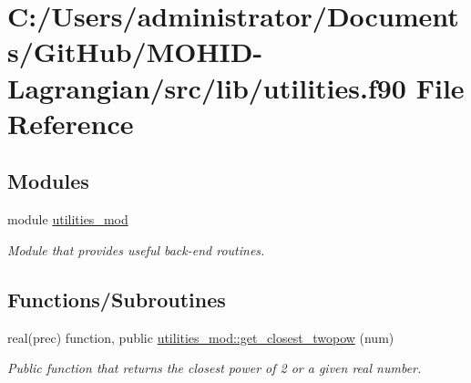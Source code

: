 \hypertarget{utilities_8f90}{}\section{C\+:/\+Users/administrator/\+Documents/\+Git\+Hub/\+M\+O\+H\+I\+D-\/\+Lagrangian/src/lib/utilities.f90 File Reference}
\label{utilities_8f90}
\subsection*{Modules}
\begin{DoxyCompactItemize}
\item 
module \mbox{\hyperlink{namespaceutilities__mod}{utilities\+\_\+mod}}
\begin{DoxyCompactList}\small\item\em Module that provides useful back-\/end routines. \end{DoxyCompactList}\end{DoxyCompactItemize}
\subsection*{Functions/\+Subroutines}
\begin{DoxyCompactItemize}
\item 
real(prec) function, public \mbox{\hyperlink{namespaceutilities__mod_a683f93677348e11d331c1c37c66caf7a}{utilities\+\_\+mod\+::get\+\_\+closest\+\_\+twopow}} (num)
\begin{DoxyCompactList}\small\item\em Public function that returns the closest power of 2 or a given real number. \end{DoxyCompactList}\end{DoxyCompactItemize}
